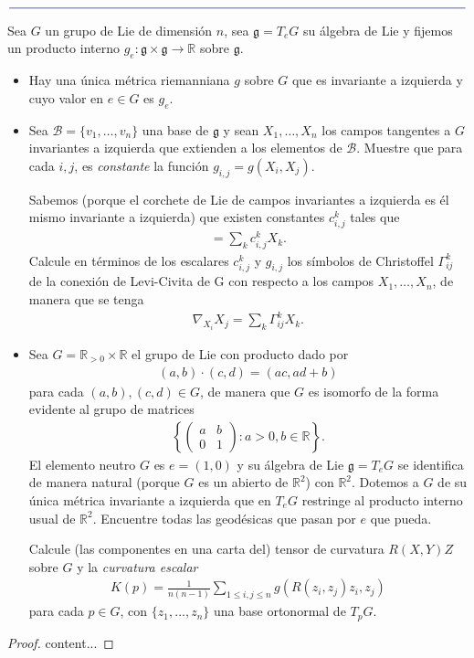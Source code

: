 \documentclass[11pt]{article}
\newcommand{\R}{\mathbb{R}}
\newcommand{\paint}[1]{\color{color}{#1}}
\newcommand{\paintline}{\begin{center}
$\paint{
\rule{400pt}{0.5pt}
}$
\vspace{10pt}
\end{center}}
\newenvironment{exercise}[2][Ejercicio]{\begin{trivlist}
\item[\hskip \labelsep \paint{{\bfseries #1}}\hskip \labelsep {\bfseries #2.}]}{\end{trivlist}}
\begin{document}
\paintline

\begin{exercise}{5} Sea $G$ un grupo de Lie de dimensión $n$, sea $\mathfrak{g} = T_eG$ su álgebra de Lie y fijemos un producto interno $g_e : \mathfrak{g} \times \mathfrak{g} \to \R$ sobre $\mathfrak{g}$.
\begin{itemize}
\item[(a)] Hay una única métrica riemanniana $g$ sobre $G$ que es invariante a izquierda y cuyo valor en $e \in G$ es $g_e$.
\item[(b)] Sea $\mathscr{B} = \{v_1, \dots, v_n\}$ una base de $\mathfrak{g}$ y sean $X_1, \dots, X_n$ los campos tangentes a $G$ invariantes a izquierda que extienden a los elementos de $\mathscr{B}$. Muestre que para cada $i,j$, es \textit{constante} la función $g_{i,j} = g(X_i,X_j)$.

Sabemos (porque el corchete de Lie de campos invariantes a izquierda es él mismo invariante a izquierda) que existen constantes $c_{i,j}^k$ tales que
\begin{align*}
[X_i,X_j] = \sum_{k}c_{i,j}^kX_k.
\end{align*}
Calcule en términos de los escalares $c_{i,j}^k$ y $g_{i,j}$ los símbolos de Christoffel $\Gamma_{ij}^k$ de la conexión de Levi-Civita de G con respecto a los campos $X_1, \dots, X_n$, de manera que se tenga
\begin{align*}
\nabla_{X_i}X_j = \sum_k\Gamma_{ij}^kX_k.
\end{align*}
\item[(c)] Sea $G = \R_{>0 } \times \R$ el grupo de Lie con producto dado por
\begin{align*}
(a,b) \cdot (c,d) = (ac,ad+b)
\end{align*}
para cada $(a,b),(c,d) \in G$, de manera que $G$ es isomorfo de la forma evidente al grupo de matrices 
\begin{align*}
\left\{\begin{pmatrix}
a & b \\
0 & 1
\end{pmatrix} : a >0, b \in \R\right\}.
\end{align*}
El elemento neutro $G$ es $e = (1,0)$ y su álgebra de Lie $\mathfrak{g} = T_eG$ se identifica de manera natural (porque $G$ es un abierto de $\R^2$) con $\R^2$. Dotemos a $G$ de su única métrica invariante a izquierda que en $T_eG$ restringe al producto interno usual de $\R^2$. Encuentre todas las geodésicas que pasan por $e$ que pueda.

Calcule (las componentes en una carta del) tensor de curvatura $R(X,Y)Z$ sobre $G$ y la \textit{curvatura escalar}
\begin{align*}
K(p) = \frac{1}{n(n-1)} \sum_{1 \leq i,j \leq n}g(R(z_i,z_j)z_i,z_j)
\end{align*}
para cada $p \in G$, con $\{z_1, \dots, z_n\}$ una base ortonormal de $T_pG$.
\end{itemize}
\end{exercise}
\begin{proof}
content...
\end{proof}
\end{document}
